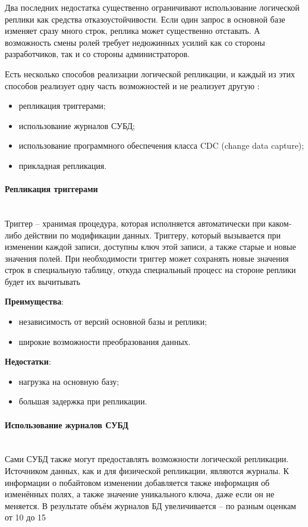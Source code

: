 Два последних недостатка существенно ограничивают использование логической реплики как средства отказоустойчивости. Если
один запрос в основной базе изменяет сразу много строк, реплика может существенно отставать. А возможность смены ролей
требует недюжинных усилий как со стороны разработчиков, так и со стороны администраторов.

Есть несколько способов реализации логической репликации, и каждый из этих способов реализует одну часть возможностей и
не реализует другую \autocite{PhysLogPeplic}:
\begin{itemize}
    \item репликация триггерами;
    \item использование журналов СУБД;
    \item использование программного обеспечения класса CDC (change data capture);
    \item прикладная репликация.
\end{itemize}

\paragraph{Репликация триггерами} ~\\
Триггер – хранимая процедура, которая исполняется автоматически при каком-либо действии по модификации данных. Триггеру,
который вызывается при изменении каждой записи, доступны ключ этой записи, а также старые и новые значения полей. При
необходимости триггер может сохранять новые значения строк в специальную таблицу, откуда специальный процесс на стороне
реплики будет их вычитывать

\textbf{Преимущества}:
\begin{itemize}
    \item независимость от версий основной базы и реплики;
    \item широкие возможности преобразования данных.
\end{itemize}

\textbf{Недостатки}:
\begin{itemize}
    \item нагрузка на основную базу;
    \item большая задержка при репликации.
\end{itemize}

\paragraph{Использование журналов СУБД} ~\\
Сами СУБД также могут предоставлять возможности логической репликации. Источником данных, как и для физической
репликации, являются журналы. К информации о побайтовом изменении добавляется также информация об изменённых полях, а
также значение уникального ключа, даже если он не меняется. В результате объём журналов БД увеличивается – по разным
оценкам от 10 до 15%

